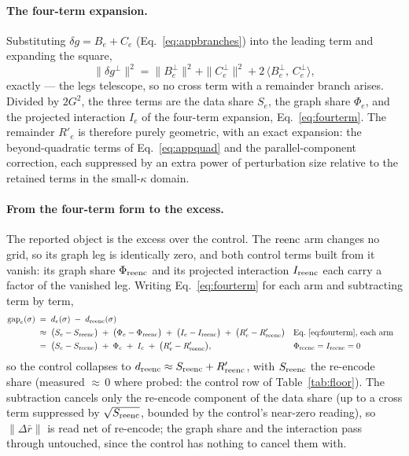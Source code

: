 \paragraph{The four-term expansion.} Substituting
$\delta g = B_e + C_e$ (Eq.~\ref{eq:appbranches}) into the leading
term and expanding the square,
\begin{equation*}
\|\delta g^{\perp}\|^2
= \|B_e^{\perp}\|^2 + \|C_e^{\perp}\|^2
+ 2\,\langle B_e^{\perp},\, C_e^{\perp}\rangle,
\end{equation*}
exactly --- the legs telescope, so no cross term with a remainder
branch arises. Divided by $2G^2$, the three terms are the data share
$S_e$, the graph share $\Phi_e$, and the projected interaction $I_e$
of the four-term expansion, Eq.~\ref{eq:fourterm}. The remainder
$R'_e$ is therefore purely geometric, with an exact expansion: the
beyond-quadratic terms of Eq.~\ref{eq:appquad} and the
parallel-component correction, each suppressed by an extra power of
perturbation size relative to the retained terms in the
small-$\kappa$ domain.

\paragraph{From the four-term form to the excess.} The reported object
is the excess over the control. The $\mathrm{reenc}$ arm changes no grid, so
its graph leg is identically zero, and both control terms built from
it vanish: its graph share $\Phi_{\mathrm{reenc}}$ and its projected
interaction $I_{\mathrm{reenc}}$ each carry a factor of the vanished
leg. Writing
Eq.~\ref{eq:fourterm} for each arm and subtracting term by term,
\begin{align*}
\mathrm{gap}_e(\sigma)
\;&=\; d_e(\sigma) \;-\; d_{\mathrm{reenc}}(\sigma)\\
&\approx\;
\big(S_e - S_{\mathrm{reenc}}\big) \;+\; \big(\Phi_e - \Phi_{\mathrm{reenc}}\big)
\;+\; \big(I_e - I_{\mathrm{reenc}}\big) \;+\; \big(R'_e - R'_{\mathrm{reenc}}\big)
&&\text{Eq.~\ref{eq:fourterm}, each arm}\\
&=\;
\big(S_e - S_{\mathrm{reenc}}\big) \;+\; \Phi_e \;+\; I_e
\;+\; \big(R'_e - R'_{\mathrm{reenc}}\big),
&&\Phi_{\mathrm{reenc}} = I_{\mathrm{reenc}} = 0
\end{align*}
so the control collapses to
$d_{\mathrm{reenc}} \approx S_{\mathrm{reenc}} + R'_{\mathrm{reenc}}$, with $S_{\mathrm{reenc}}$ the
re-encode share (measured ${\approx}\,0$ where probed: the control row
of Table~\ref{tab:floor}). The subtraction cancels only the re-encode
component of the data share (up to a cross term suppressed by
$\sqrt{S_{\mathrm{reenc}}}$, bounded by the control's near-zero reading), so
$\|\Delta\bar r\|$ is read net of re-encode; the graph share and the
interaction pass through untouched, since the control has nothing to
cancel them with.

